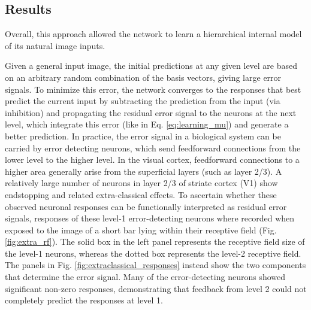 \documentclass[10pt]{article}
\begin{document}
\subsection{Results}
Overall, this approach allowed the network to learn a hierarchical internal model of its natural image inputs.
\begin{comment}
\begin{figure}[!ht]
    \centering
    \texttt{[image: pr\_extra\_classical\_responses.png]}
    \caption{Endstopping behaviour of model layer-1 error-neurons. The first row of plots shows the responses of the 32 error detecting model neurons in the central level-1 module in response to the short bar (left box in Fig. \ref{fig:extra_rf}). The second row shows the same quantity, but this time whene the model is presented with the bar that span beyond the classical receptive field (right box in Fig. \ref{fig:extra_rf}). Figure taken and adapted from \citep{Rao1999}.}
    \label{fig:extraclassical_responses}
\end{figure}
\end{comment}
Given a general input image, the initial predictions at any given level
are based on an arbitrary random combination of the basis vectors, giving large error signals. To minimize this error, the network converges to the responses that best predict the current input by subtracting the prediction from the input (via inhibition) and propagating the residual error signal to the neurons at the next level, which integrate this error (like in Eq. \ref{eq:learning_mu}) and generate a better prediction.
In practice, the error signal in a biological system can be carried by error detecting neurons, which send feedforward connections from the lower level to the higher level. 
In the visual cortex, feedforward connections to a higher area generally arise from the superficial layers (such as layer 2/3). 
A relatively large number of neurons in layer 2/3 of striate cortex (V1) show endstopping and related extra-classical effects. To ascertain whether these observed neuronal responses can be functionally interpreted as residual error signals, responses of these level-1 error-detecting neurons where recorded when exposed to the image of a short bar lying within their receptive field (Fig. \ref{fig:extra_rf}). 
The solid box in the left panel represents the receptive field size of the level-1 neurons, whereas the dotted box represents the level-2 receptive field. The panels in Fig. \ref{fig:extraclassical_responses} instead show the two components that determine the error signal. Many of the error-detecting neurons showed significant non-zero responses, demonstrating that feedback from level 2 could not completely predict the responses at level 1.
\end{document}
